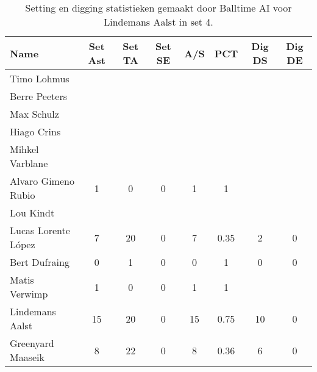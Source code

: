 \begin{table}[ht!]
  \centering
  \scriptsize
  \begin{tabular}{|l|c|c|c|c|c|c|c|} \hline
    \textbf{Name} & Set Ast & Set TA & Set SE & A/S & PCT & Dig DS & Dig DE \\ \hline
    Timo Lohmus &   &   &   &   &   &   &   \\
    Berre Peeters &   &   &   &   &   &   &   \\
    Max Schulz &   &   &   &   &   &   &   \\
    Hiago Crins &   &   &   &   &   &   &   \\
    Mihkel Varblane &   &   &   &   &   &   &   \\
    Alvaro Gimeno Rubio & 1 & 0 & 0 & 1 & 1 &   &   \\
    Lou Kindt &   &   &   &   &   &   &   \\
    Lucas Lorente López & 7 & 20 & 0 & 7 & 0.35 & 2 & 0 \\
    Bert Dufraing & 0 & 1 & 0 & 0 & 1 & 0 & 0 \\
    Matis Verwimp & 1 & 0 & 0 & 1 & 1 &   &   \\
    Lindemans Aalst & 15 & 20 & 0 & 15 & 0.75 & 10 & 0 \\
    Greenyard Maaseik & 8 & 22 & 0 & 8 & 0.36 & 6 & 0 \\ \hline
  \end{tabular}
  \caption[Setting en digging statistieken gemaakt door Balltime AI voor Lindemans Aalst in set 4]{\label{tab:PL3SetDigAalst4}Setting en digging statistieken gemaakt door Balltime AI voor Lindemans Aalst in set 4.}
\end{table}

